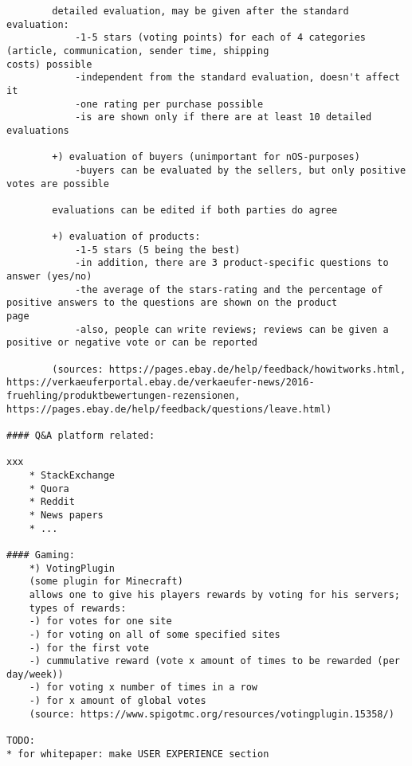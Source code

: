 {{\begin{verbatim}
		detailed evaluation, may be given after the standard evaluation: 
			-1-5 stars (voting points) for each of 4 categories (article, communication, sender time, shipping 						costs) possible
			-independent from the standard evaluation, doesn't affect it
			-one rating per purchase possible
			-is are shown only if there are at least 10 detailed evaluations

		+) evaluation of buyers (unimportant for nOS-purposes)
			-buyers can be evaluated by the sellers, but only positive votes are possible

		evaluations can be edited if both parties do agree

		+) evaluation of products: 
			-1-5 stars (5 being the best) 
			-in addition, there are 3 product-specific questions to answer (yes/no) 
			-the average of the stars-rating and the percentage of positive answers to the questions are shown on the product 			   page
			-also, people can write reviews; reviews can be given a positive or negative vote or can be reported
		
		(sources: https://pages.ebay.de/help/feedback/howitworks.html, https://verkaeuferportal.ebay.de/verkaeufer-news/2016-				fruehling/produktbewertungen-rezensionen, https://pages.ebay.de/help/feedback/questions/leave.html)

#### Q&A platform related:

xxx
	* StackExchange
	* Quora
	* Reddit
	* News papers
	* ...

#### Gaming: 
	*) VotingPlugin 
	(some plugin for Minecraft)
	allows one to give his players rewards by voting for his servers; 
	types of rewards: 
	-) for votes for one site
	-) for voting on all of some specified sites
	-) for the first vote
	-) cummulative reward (vote x amount of times to be rewarded (per day/week)) 
	-) for voting x number of times in a row
	-) for x amount of global votes
	(source: https://www.spigotmc.org/resources/votingplugin.15358/)

TODO: 
* for whitepaper: make USER EXPERIENCE section 
    
    
\end{verbatim}
}}
